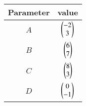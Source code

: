 \begin{tabular}[12pt]{ |c| c|}
    \hline
    \textbf{Parameter} & \textbf{value}\\ 
    \hline
	$A$ & $\begin{pmatrix}-2\\3\end{pmatrix}$\\
    \hline 
	$B$ & $\begin{pmatrix}6\\7\end{pmatrix}$\\
    \hline
	$C$ & $\begin{pmatrix}8\\3\end{pmatrix}$\\
    \hline   
	$D$ & $\begin{pmatrix}0\\-1\end{pmatrix}$\\
    \hline
    \end{tabular}
